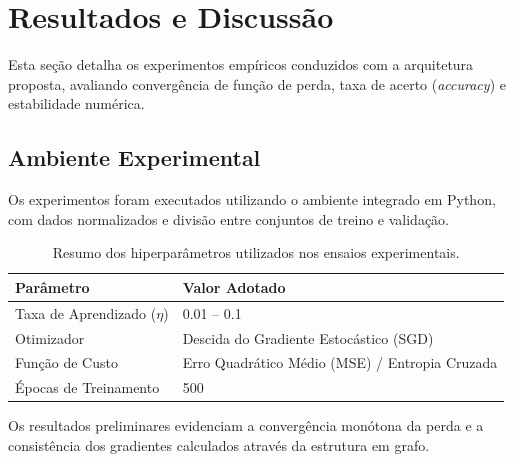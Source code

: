 ﻿\section{Resultados e Discussão}
\label{sec:experimentos}

Esta seção detalha os experimentos empíricos conduzidos com a arquitetura proposta, avaliando convergência de função de perda, taxa de acerto (\textit{accuracy}) e estabilidade numérica.

\subsection{Ambiente Experimental}
Os experimentos foram executados utilizando o ambiente integrado em Python, com dados normalizados e divisão entre conjuntos de treino e validação.

\begin{table}[ht]
\centering
\caption{Resumo dos hiperparâmetros utilizados nos ensaios experimentais.}
\label{tab:hiperparametros}
\begin{tabular}{@{}ll@{}}
\toprule
\textbf{Parâmetro} & \textbf{Valor Adotado} \\ \midrule
Taxa de Aprendizado ($\eta$) & 0.01 -- 0.1 \\
Otimizador & Descida do Gradiente Estocástico (SGD) \\
Função de Custo & Erro Quadrático Médio (MSE) / Entropia Cruzada \\
Épocas de Treinamento & 500 \\ \bottomrule
\end{tabular}
\end{table}

Os resultados preliminares evidenciam a convergência monótona da perda e a consistência dos gradientes calculados através da estrutura em grafo.
